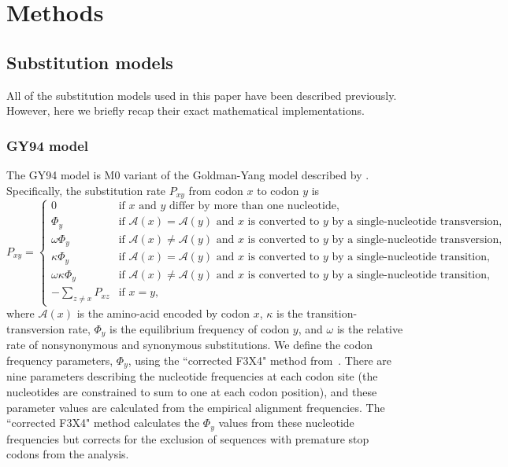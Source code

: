 \documentclass[11pt]{article}
\begin{document}
\clearpage
\section*{Methods}

\subsection*{Substitution models}
All of the substitution models used in this paper have been described previously.
However, here we briefly recap their exact mathematical implementations.

\subsubsection*{GY94 model}

The GY94 model is M0 variant of the Goldman-Yang model described by \citet{yang2000codon}. 
Specifically, the substitution rate $P_{xy}$ from codon $x$ to codon $y$ is 
\begin{equation}
\label{eq:GY94}
P_{xy} = 
\begin{cases}
  0 & \mbox{if $x$ and $y$ differ by more than one nucleotide,}\\
  \Phi_y & \mbox{if $\mathcal{A}\left(x\right) = \mathcal{A}\left(y\right)$ and $x$ is converted to $y$ by a single-nucleotide transversion,} \\
  \omega \Phi_{y} & \mbox{if $\mathcal{A}\left(x\right) \ne \mathcal{A}\left(y\right)$ and $x$ is converted to $y$ by a single-nucleotide transversion,} \\
  \kappa \Phi_y & \mbox{if $\mathcal{A}\left(x\right) = \mathcal{A}\left(y\right)$ and $x$ is converted to $y$ by a single-nucleotide transition,} \\
  \omega \kappa \Phi_{y} & \mbox{if $\mathcal{A}\left(x\right) \ne \mathcal{A}\left(y\right)$ and $x$ is converted to $y$ by a single-nucleotide transition,} \\
  -\sum\limits_{z \ne x} P_{xz} & \mbox{if $x = y$,}
  \end{cases}
\end{equation}
where $\mathcal{A}\left(x\right)$ is the amino-acid encoded by codon $x$, $\kappa$ is the transition-transversion rate, $\Phi_y$ is the equilibrium frequency of codon $y$, and $\omega$ is the relative rate of nonsynonymous and synonymous substitutions.
We define the codon frequency parameters, $\Phi_y$, using the ``corrected F3X4" method from~\citet{pond2010correcting}. 
There are nine parameters describing the nucleotide frequencies at each codon site (the nucleotides are constrained to sum to one at each codon position),  and these parameter values are calculated from the empirical alignment frequencies. 
The ``corrected F3X4" method calculates the $\Phi_y$ values from these nucleotide frequencies but corrects for the exclusion of sequences with premature stop codons from the analysis. 
\end{document}
